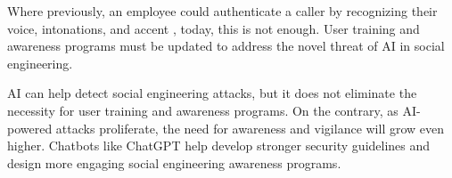 
Where previously, an employee could authenticate a caller by recognizing their voice, intonations, and accent \citep{mitnick_The_Art_of_Deception_2003}, today, this is not enough. User training and awareness programs must be updated to address the novel threat of AI in social engineering.



AI can help detect social engineering attacks, but it does not eliminate the necessity for user training and awareness programs. On the contrary, as AI-powered attacks proliferate, the need for awareness and vigilance will grow even higher. Chatbots like ChatGPT help develop stronger security guidelines and design more engaging social engineering awareness programs.

